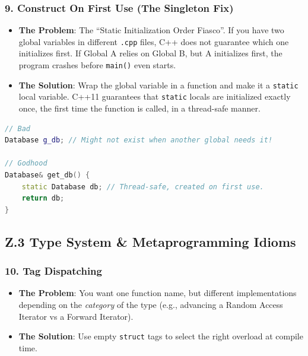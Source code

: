 \hypertarget{construct-on-first-use-the-singleton-fix}{%
\subsubsection{9. Construct On First Use (The Singleton
Fix)}\label{construct-on-first-use-the-singleton-fix}}

\begin{itemize}
\tightlist
\item
  \textbf{The Problem}: The ``Static Initialization Order Fiasco''. If
  you have two global variables in different
  \passthrough{\lstinline!.cpp!} files, C++ does not guarantee which one
  initializes first. If Global A relies on Global B, but A initializes
  first, the program crashes before \passthrough{\lstinline!main()!}
  even starts.
\item
  \textbf{The Solution}: Wrap the global variable in a function and make
  it a \passthrough{\lstinline!static!} local variable. C++11 guarantees
  that \passthrough{\lstinline!static!} locals are initialized exactly
  once, the first time the function is called, in a thread-safe manner.
\end{itemize}

\begin{lstlisting}[language={C++}]
// Bad
Database g_db; // Might not exist when another global needs it!

// Godhood
Database& get_db() {
    static Database db; // Thread-safe, created on first use.
    return db;
}
\end{lstlisting}

\hypertarget{z.3-type-system-metaprogramming-idioms}{%
\subsection{Z.3 Type System \& Metaprogramming
Idioms}\label{z.3-type-system-metaprogramming-idioms}}

\hypertarget{tag-dispatching}{%
\subsubsection{10. Tag Dispatching}\label{tag-dispatching}}

\begin{itemize}
\tightlist
\item
  \textbf{The Problem}: You want one function name, but different
  implementations depending on the \emph{category} of the type (e.g.,
  advancing a Random Access Iterator vs a Forward Iterator).
\item
  \textbf{The Solution}: Use empty \passthrough{\lstinline!struct!} tags
  to select the right overload at compile time.
\end{itemize}

